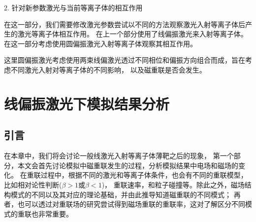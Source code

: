 2. 针对新参数激光与当前等离子体的相互作用

在这一部分，我们需要修改激光参数尝试以不同的方法观察激光入射等离子体后产生的激光等离子体相互作用。
在上一个部分使用了线偏振激光来入射等离子体。在这一部分考虑使用圆偏振激光入射等离子体观察其相互作用。

这里圆偏振激光考虑使用两束线偏激光透过不同相位和偏振方向组合而成，旨在考虑不同激光入射对等离子体的不同影响，
以及磁重联是否会发生。
\begin{comment}
\section[\textnormal{激光等离子体相互作用}]{\textbf{激光等离子体相互作用}}

1. 首先考虑线偏振激光入射后的等离子体行为：
我们考虑到该实验是需要人为触发磁场重联现象，激光入射等离子体后，会有

激光等离子体相互作用过程描述：
在这一部分，你可以介绍激光与等离子体相互作用的基本过程，包括激光入射后与等离子体的相互作用方式，可能产生的等离子体反应等。你可以详细描述激光的传播、吸收和散射过程，以及激光能量如何转化为等离子体动能等方面的情况。

影响参数及实验设置：
在这一部分，你可以介绍不同参数设置下激光等离子体相互作用的影响。包括激光参数的变化如何影响等离子体的响应，以及不同实验条件下可能产生的物理效应。你可以列举不同参数设置的方案，并讨论其可能的影响和预期的结果。

激光等离子体相互作用的物理效应：
在这一部分，你可以详细描述激光与等离子体相互作用可能产生的物理效应。这些效应可能包括等离子体的加热、加速、激发等，以及激光与等离子体相互作用后可能产生的等离子体波动、磁重联等现象。

2. 接着考虑圆偏振激光入射后的等离子体行为：

在圆偏振激光的情况中，我们设置的是

\end{comment}

\chapter{\textbf{线偏振激光下模拟结果分析}}

\section[\textnormal{引言}]{\textbf{引言}}

在本章中，我们将会讨论一般线激光入射等离子体薄靶之后的现象，
第一个部分，本文会首先讨论模拟中磁重联发生的过程，分析模拟结果中电场和磁场的变化。
在重联过程中，根据不同的激光和等离子体条件，也会有不同的重联模型\cite{2009ARA&A..47..291Z}，比如相对论性判断($\beta>1$或$\beta<1$)，
重联速率，和粒子碰撞等。除此之外，磁场结构模式的不同以及其对应的理论基础，并由此推导知道磁重联的不同模式；
再者，也可以透过对重联场的研究尝试得到磁场重联的重联率，这对了解区分不同模式的重联也非常重要。%

